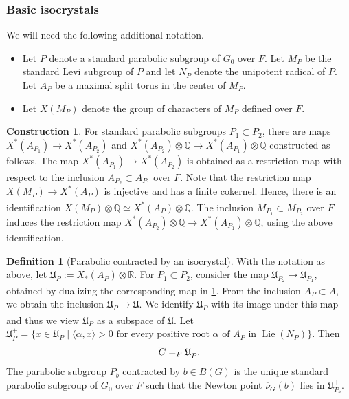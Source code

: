 \documentclass[11pt,a4paper]{article}
\let\coprod\relax
\theoremstyle{definition}
\newtheorem{D}[shared]{Definition}
\newtheorem{const}[shared]{Construction}
\theoremstyle{plain}
\theoremstyle{remark}
\theoremstyle{plain}
\DeclareMathOperator{\Lie}{Lie}
\begin{document}
\subsubsection{Basic isocrystals}
We will need the following additional notation.
\begin{itemize}
    \item Let $P$ denote a standard parabolic subgroup of $G_0$ over $F$. Let $M_P$ be the standard Levi subgroup of $P$ and let $N_P$ denote the unipotent radical of $P$. Let $A_P$ be a maximal split torus in the center of $M_P$.
    \item Let $X(M_P)$ denote the group of characters of $M_P$ defined over $F$.
\end{itemize}

\begin{const}\label{paraboliclemma}
     For standard parabolic subgroups $P_1 \subset P_2$, there are maps $X^*(A_{P_1}) \xrightarrow[]{} X^*(A_{P_2})$ and $X^*(A_{P_2}) \otimes \mathbb{Q} \xrightarrow[]{} X^*(A_{P_1}) \otimes \mathbb{Q}$ constructed as follows. The map $X^*(A_{P_1}) \xrightarrow[]{} X^*(A_{P_2})$ is obtained as a restriction map with respect to the inclusion $A_{P_2} \subset A_{P_1}$ over $F$. Note that the restriction map $X(M_P) \xrightarrow[]{} X^*(A_P)$ is injective and has a finite cokernel. Hence, there is an identification $X(M_P) \otimes \mathbb{Q} \simeq X^*(A_P)\otimes \mathbb{Q}$. The inclusion $M_{P_1} \subset M_{P_2}$ over $F$ induces the restriction map $X^*(A_{P_2}) \otimes \mathbb{Q} \xrightarrow[]{} X^*(A_{P_1}) \otimes \mathbb{Q}$, using the above identification.
\end{const}


\begin{D}[Parabolic contracted by an isocrystal]\label{paracontractediso}
    With the notation as above, let $\mathfrak{U}_P := X_*(A_P) \otimes \mathbb{R}$. For $P_1 \subset P_2$, consider the map $\mathfrak{U}_{P_2} \xrightarrow[]{} \mathfrak{U}_{P_1}$, obtained by dualizing the corresponding map in \ref{paraboliclemma}. From the inclusion $A_P \subset A$, we obtain the inclusion $\mathfrak{U}_P \xrightarrow[]{} \mathfrak{U}$. We identify $\mathfrak{U}_P$ with its image under this map and thus we view $\mathfrak{U}_P$ as a subspace of $\mathfrak{U}$. Let $\mathfrak{U}_P^+ = \{ x \in \mathfrak{U}_P \mid \langle \alpha , x \rangle > 0 \text{ for every positive root } \alpha \text{ of } A_P \text{ in } \Lie(N_P)\}$. Then
    $$ \overline{C} = \coprod_P \mathfrak{U}_P^+.$$
    The parabolic subgroup $P_b$ contracted by $b \in B(G)$ is the unique standard parabolic subgroup of $G_0$ over $F$ such that the Newton point $\overline{\nu}_G(b)$ lies in $\mathfrak{U}_{P_b}^+$.
\end{D}
\end{document}
